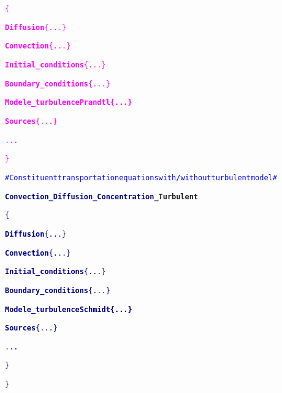 \begin{center}
{\begin{minipage}[c]{0.98\textwidth}
\begin{alltt}
\hspace{1cm}    \textcolor{magenta}{\{}

\hspace{2cm}        \textcolor{magenta}{{\bf{Diffusion}} \{ ... \}}

\hspace{2cm}        \textcolor{magenta}{{\bf{Convection}} \{ ... \}}

\hspace{2cm}        \textcolor{magenta}{{\bf{Initial\_conditions}} \{ ... \}}

\hspace{2cm}        \textcolor{magenta}{{\bf{Boundary\_conditions}} \{ ... \}}

\hspace{2cm}        \textcolor{magenta}{{\bf{\textcolor{Greeen}{Modele\_turbulence Prandtl \{ ... \} } }}}

\hspace{2cm}        \textcolor{magenta}{{\bf{Sources}} \{ ... \}}

\hspace{2cm}        \textcolor{magenta}{...}

\hspace{1cm}    \textcolor{magenta}{\}}

\hspace{1cm}    \textcolor{blue}{\# Constituent transportation equations with/without turbulent model \#}

\hspace{1cm}    {\bf{\textcolor{darkblue}{Convection\_Diffusion\_Concentration}\textcolor{Greeen}{\_Turbulent}}}

\hspace{1cm}    \textcolor{darkblue}{\{}

\hspace{2cm}        \textcolor{darkblue}{{\bf{Diffusion}} \{ ... \}}

\hspace{2cm}        \textcolor{darkblue}{{\bf{Convection}} \{ ... \}}

\hspace{2cm}        \textcolor{darkblue}{{\bf{Initial\_conditions}} \{ ... \}}

\hspace{2cm}        \textcolor{darkblue}{{\bf{Boundary\_conditions}} \{ ... \}}

\hspace{2cm}        \textcolor{darkblue}{{\bf{\textcolor{Greeen}{Modele\_turbulence Schmidt \{ ... \} } }}}

\hspace{2cm}        \textcolor{darkblue}{{\bf{Sources}} \{ ... \}}

\hspace{2cm}        \textcolor{darkblue}{...}

\hspace{1cm}    \textcolor{darkblue}{\}}

\}
\end{alltt}
\end{minipage}}
\end{center}

